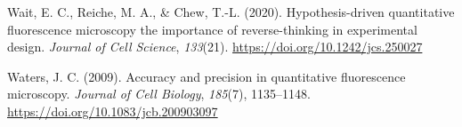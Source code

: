 \documentclass[
]{agujournal2019}
\newlength{\cslhangindent}
\newlength{\cslentryspacingunit} %
\newenvironment{CSLReferences}[2] %
 {%
  \setlength{\parindent}{0pt}
  \ifodd #1
  \let\oldpar\par
  \def\par{\hangindent=\cslhangindent\oldpar}
  \fi
  \setlength{\parskip}{#2\cslentryspacingunit}
 }%
 {}
\begin{document}
\begin{CSLReferences}{1}{0}
\leavevmode{}%
Wait, E. C., Reiche, M. A., \& Chew, T.-L. (2020). Hypothesis-driven
quantitative fluorescence microscopy {\textendash} the importance of
reverse-thinking in experimental design. \emph{Journal of Cell Science},
\emph{133}(21). \url{https://doi.org/10.1242/jcs.250027}

\leavevmode{}%
Waters, J. C. (2009). Accuracy and precision in quantitative
fluorescence microscopy. \emph{Journal of Cell Biology}, \emph{185}(7),
1135--1148. \url{https://doi.org/10.1083/jcb.200903097}

\end{CSLReferences}
\end{document}
